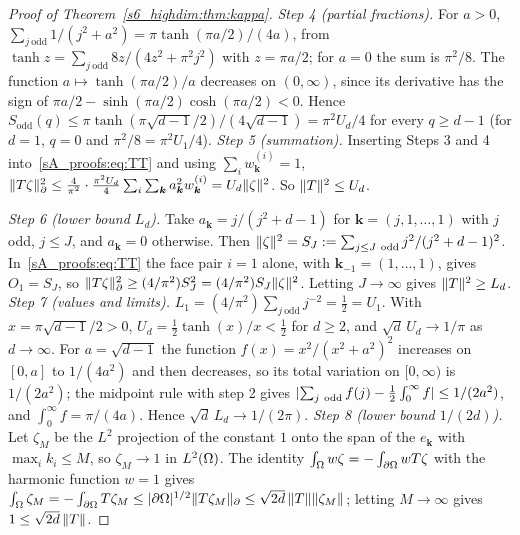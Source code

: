 \begin{proof}[Proof of Theorem~\ref{s6_highdim:thm:kappa}]
\emph{Step 4 (partial fractions).} For $a>0$,
$\sum_{j\ \mathrm{odd}}1/(j^2+a^2)=\pi\tanh(\pi a/2)/(4a)$, from
$\tanh z=\sum_{j\ \mathrm{odd}}8z/(4z^2+\pi^2j^2)$ with $z=\pi a/2$; for $a=0$ the sum is $\pi^2/8$.
The function $a\mapsto\tanh(\pi a/2)/a$ decreases on $(0,\infty)$, since its derivative has the
sign of $\pi a/2-\sinh(\pi a/2)\cosh(\pi a/2)<0$. Hence
$S_{\mathrm{odd}}(q)\le\pi\tanh(\pi\sqrt{d-1}/2)/(4\sqrt{d-1})=\pi^2U_d/4$ for every $q\ge d-1$
(for $d=1$, $q=0$ and $\pi^2/8=\pi^2U_1/4$).
\emph{Step 5 (summation).} Inserting Steps 3 and 4 into~\eqref{sA_proofs:eq:TT} and using
$\sum_iw^{(i)}_{\boldsymbol k}=1$,
$\lVert T\zeta\rVert_{\partial}^2\le\frac4{\pi^2}\cdot\frac{\pi^2U_d}4\sum_i\sum_{\boldsymbol k}a_{\boldsymbol k}^2w^{(i)}_{\boldsymbol k}=U_d\lVert \zeta\rVert^2$.
So $\lVert T\rVert^2\le U_d$.

\emph{Step 6 (lower bound $L_d$).} Take $a_{\boldsymbol k}=j/(j^2+d-1)$ for $\boldsymbol k=(j,1,\dots,1)$
with $j$ odd, $j\le J$, and $a_{\boldsymbol k}=0$ otherwise. Then
$\lVert \zeta\rVert^2=S_J:=\sum_{j\le J\ \mathrm{odd}}j^2/(j^2+d-1)^2$. In~\eqref{sA_proofs:eq:TT} the face
pair $i=1$ alone, with $\boldsymbol k_{-1}=(1,\dots,1)$, gives $O_1=S_J$, so
$\lVert T\zeta\rVert_{\partial}^2\ge(4/\pi^2)S_J^2=(4/\pi^2)S_J\lVert \zeta\rVert^2$. Letting $J\to\infty$ gives
$\lVert T\rVert^2\ge L_d$.
\emph{Step 7 (values and limits).} $L_1=(4/\pi^2)\sum_{j\ \mathrm{odd}}j^{-2}=\frac12=U_1$. With
$x=\pi\sqrt{d-1}/2>0$, $U_d=\frac12\tanh(x)/x<\frac12$ for $d\ge2$, and $\sqrt d\,U_d\to1/\pi$ as
$d\to\infty$. For $a=\sqrt{d-1}$ the function $f(x)=x^2/(x^2+a^2)^2$ increases on $[0,a]$ to
$1/(4a^2)$ and then decreases, so its total variation on $[0,\infty)$ is $1/(2a^2)$; the midpoint
rule with step 2 gives $\abs{\sum_{j\ \mathrm{odd}}f(j)-\frac12\int_0^\infty f}\le1/(2a^2)$, and
$\int_0^\infty f=\pi/(4a)$. Hence $\sqrt d\,L_d\to1/(2\pi)$.
\emph{Step 8 (lower bound $1/(2d)$).} Let $\zeta_M$ be the $L^2$ projection of the constant $1$ onto
the span of the $e_{\boldsymbol k}$ with $\max_ik_i\le M$, so $\zeta_M\to1$ in $L^2(\Omega)$. The
identity $\int_\Omega w\zeta=-\int_{\partial\Omega}wT\zeta$ with the harmonic function $w=1$ gives
$\int_\Omega\zeta_M=-\int_{\partial\Omega}T\zeta_M\le\lvert \partial\Omega\rvert^{1/2}\lVert T\zeta_M\rVert_{\partial}\le\sqrt{2d}\,\lVert T\rVert\lVert \zeta_M\rVert$;
letting $M\to\infty$ gives $1\le\sqrt{2d}\,\lVert T\rVert$.
\end{proof}

